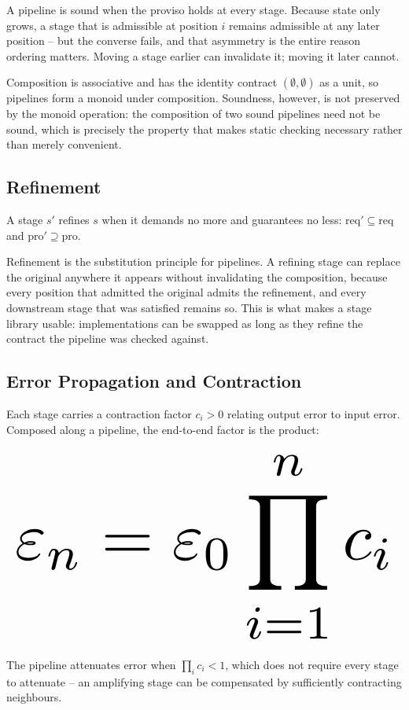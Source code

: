 \documentclass[10pt,journal,compsoc,twocolumn]{IEEEtran}
\begin{document}
A pipeline is sound when the proviso holds at every stage. Because state only grows, a stage that is admissible at position $i$ remains admissible at any later position -- but the converse fails, and that asymmetry is the entire reason ordering matters. Moving a stage earlier can invalidate it; moving it later cannot.

Composition is associative and has the identity contract $(\emptyset, \emptyset)$ as a unit, so pipelines form a monoid under composition. Soundness, however, is not preserved by the monoid operation: the composition of two sound pipelines need not be sound, which is precisely the property that makes static checking necessary rather than merely convenient.


\subsection{Refinement}


A stage $s'$ refines $s$ when it demands no more and guarantees no less: $\mathrm{req}' \subseteq \mathrm{req}$ and $\mathrm{pro}' \supseteq \mathrm{pro}$.

Refinement is the substitution principle for pipelines. A refining stage can replace the original anywhere it appears without invalidating the composition, because every position that admitted the original admits the refinement, and every downstream stage that was satisfied remains so. This is what makes a stage library usable: implementations can be swapped as long as they refine the contract the pipeline was checked against.


\subsection{Error Propagation and Contraction}


Each stage carries a contraction factor $c_i > 0$ relating output error to input error. Composed along a pipeline, the end-to-end factor is the product:




\begin{equation}
\resizebox{\columnwidth}{!}{$\displaystyle
\begin{aligned}
\varepsilon_n = \varepsilon_0 \prod_{i=1}^{n} c_i
\end{aligned}
$}
\end{equation}




The pipeline attenuates error when $\prod_i c_i < 1$, which does not require every stage to attenuate -- an amplifying stage can be compensated by sufficiently contracting neighbours.
\end{document}
